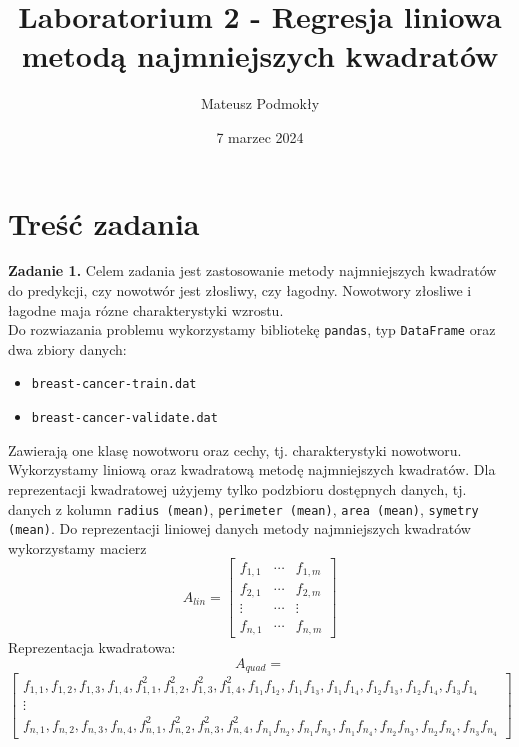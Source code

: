 \documentclass[11pt]{scrartcl}
\title{Laboratorium 2 - Regresja liniowa metodą najmniejszych kwadratów}
\author{Mateusz Podmokły}
\date{7 marzec 2024}
\begin{document}
    \maketitle

    \section{Treść zadania}
    \textbf{Zadanie 1.} Celem zadania jest zastosowanie metody najmniejszych kwadratów
    do predykcji, czy nowotwór jest złosliwy, czy łagodny. Nowotwory złosliwe i łagodne
    maja rózne charakterystyki wzrostu. \\
    Do rozwiazania problemu wykorzystamy bibliotekę \texttt{pandas}, typ
    \texttt{DataFrame} oraz dwa zbiory danych:
    \begin{itemize}[label=--]
        \item \texttt{breast-cancer-train.dat}
        \item \texttt{breast-cancer-validate.dat}
    \end{itemize}
    Zawierają one klasę nowotworu oraz cechy, tj. charakterystyki nowotworu. \\
    Wykorzystamy liniową oraz kwadratową metodę najmniejszych kwadratów. Dla
    reprezentacji kwadratowej użyjemy tylko podzbioru dostępnych danych, tj.
    danych z kolumn \texttt{radius (mean)}, \texttt{perimeter (mean)},
    \texttt{area (mean)}, \texttt{symetry (mean)}. Do reprezentacji liniowej
    danych metody najmniejszych kwadratów wykorzystamy macierz
    \[
        A_{lin}=
        \begin{bmatrix}
            f_{1,1} & \cdots & f_{1,m} \\
            f_{2,1} & \cdots & f_{2,m} \\
            \vdots & \cdots  & \vdots \\
            f_{n,1} & \cdots & f_{n,m}
        \end{bmatrix}
    \]
    Reprezentacja kwadratowa:
    \[
        A_{quad}=
    \]
    \[
        \begin{bmatrix}
            f_{1,1}, f_{1,2}, f_{1,3}, f_{1,4},
            f_{1,1}^2, f_{1,2}^2, f_{1,3}^2, f_{1,4}^2,
            f_{1_1}f_{1_2}, f_{1_1}f_{1_3}, f_{1_1}f_{1_4},
            f_{1_2}f_{1_3}, f_{1_2}f_{1_4}, f_{1_3}f_{1_4} \\
            \vdots \\
            f_{n,1}, f_{n,2}, f_{n,3}, f_{n,4},
            f_{n,1}^2, f_{n,2}^2, f_{n,3}^2, f_{n,4}^2,
            f_{n_1}f_{n_2}, f_{n_1}f_{n_3}, f_{n_1}f_{n_4},
            f_{n_2}f_{n_3}, f_{n_2}f_{n_4}, f_{n_3}f_{n_4}
        \end{bmatrix}
    \]
\end{document}

